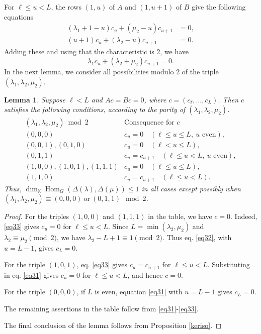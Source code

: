 \documentclass[11pt]{amsart}
\newtheorem{lemma}[theorem]{Lemma}
\theoremstyle{remark}
\theoremstyle{definition}
\newcommand{\Hom}{\operatorname{Hom}}
\newcommand{\D}{\Delta}
\newcommand{\la}{\lambda}
\newcommand{\K}{\mathbb K}
\numberwithin{equation}{section}
\begin{document}
For $\ell \le u < L$, the rows $(1,u)$ of $A$
and $(1,u+1)$ of $B$ give the following equations
	\begin{align}\label{eq31}
		(\la_1+1-u)c_u+(\mu_2-u)c_{u+1}&=0,\\\label{eq32}
		(u+1)c_u+(\la_2-u)c_{u+1}&=0.
	\end{align}
Adding these and using that the characteristic is $2$, we have \begin{equation}\label{eq33}\la_1c_u+(\la_2+\mu_2)c_{u+1}=0.\end{equation}
In the next lemma, we consider all possibilities modulo 2 of the triple $(\la_1,\la_2,\mu_2)$.
\begin{lemma}\label{lemmod2}
	Suppose $\ell<L$ and $Ac=Bc=0$, where $c=(c_\ell, \dots, c_L)$. Then $c$ satisfies the following conditions, according to the parity of $(\la_1,\la_2,\mu_2)$.
	\[
	\begin{array}{c|l}
		(\la_1,\la_2,\mu_2)\bmod2
		&\text{Consequence for }c\\\hline
		(0,0,0)
		&c_u=0\quad(\ell\le u\le L,\ u\text{ even}),\\
		(0,0,1),(0,1,0)
		&c_u=0\quad(\ell<u\le L),\\
		(0,1,1)
		&c_u=c_{u+1}\quad(\ell\le u<L,\ u\text{ even}),\\
		(1,0,0),(1,0,1),(1,1,1)
		&c_u=0\quad(\ell\le u\le L),\\
		(1,1,0)
		&c_u=c_{u+1}\quad(\ell\le u<L).
	\end{array}
	\]
	Thus, $\dim_\K\Hom_G(\D(\la),\D(\mu)) \le 1$ in all cases except possibly when $(\la_1, \la_2, \mu_2) \equiv (0,0,0) \ \text{or} \ (0,1,1) \mod 2$.
\end{lemma}
\begin{proof}
	For the triples $(1,0,0)$ and $(1,1,1)$ in the table, we have $c=0$.
	Indeed, \eqref{eq33} gives $c_u=0$ for $\ell\le u<L$.
	Since $L=\min(\la_2,\mu_2)$ and
	$\la_2\equiv\mu_2\pmod2$, we have
	$\la_2-L+1\equiv1\pmod2$. Thus eq. \eqref{eq32},
	with $u=L-1$, gives $c_L=0$.
	
	For the triple $(1,0,1)$, eq. \eqref{eq33} gives
	$c_u=c_{u+1}$ for $\ell\le u<L$.
	Substituting in eq. \eqref{eq31} gives $c_u=0$
	for $\ell\le u<L$, and hence $c=0$.
	
	For the triple $(0,0,0)$, if $L$ is even,
	equation \eqref{eq31} with $u=L-1$ gives $c_L=0$.
	
	The remaining assertions in the table follow from
	\eqref{eq31}-\eqref{eq33}.
	
	The final conclusion of the lemma follows from 
	Proposition \ref{keriso}.
	\end{proof}
\end{document}
